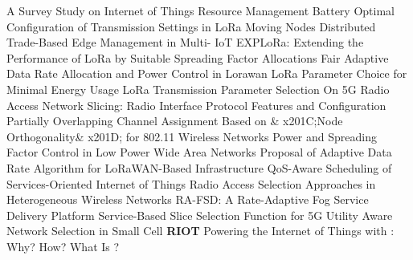  \cite{chowdhury_survey_2018} A Survey Study on {{Internet}} of {{Things}} Resource Management \newline 
 \cite{gupta_battery_2019} Battery {{Optimal Configuration}} of {{Transmission Settings}} in {{LoRa Moving Nodes}} \newline 
 \cite{samie_distributed_2018} Distributed {{Trade}}-{{Based Edge  Management}} in {{Multi}}-{{ IoT}} \newline 
 \cite{cuomo_explora_2017} {{EXPLoRa}}: {{Extending}} the Performance of {{LoRa}} by Suitable Spreading Factor Allocations \newline 
 \cite{abdelfadeel_fair_2018} Fair Adaptive Data Rate Allocation and Power Control in Lorawan \newline 
 \cite{dix-matthews_lora_2018} {{LoRa Parameter Choice}} for {{Minimal Energy Usage}} \newline 
 \cite{bor_lora_2017} {{LoRa Transmission Parameter Selection}} \newline 
 \cite{ferrus_5g_2018} On {{5G Radio Access Network Slicing}}: {{Radio Interface Protocol Features}} and {{Configuration}} \newline 
 \cite{cui_partially_2011} Partially Overlapping Channel Assignment Based on \& {{x201C}};Node Orthogonality\& {{x201D}}; for 802.11 Wireless Networks \newline 
 \cite{reynders_power_2017} Power and Spreading Factor Control in Low Power Wide Area Networks \newline 
 \cite{hauser_proposal_2017} Proposal of {{Adaptive Data Rate Algorithm}} for {{LoRaWAN}}-{{Based Infrastructure}} \newline 
 \cite{ling_li_qos-aware_2014} {{QoS}}-{{Aware Scheduling}} of {{Services}}-{{Oriented Internet}} of {{Things}} \newline 
 \cite{helou_radio_2013} Radio Access Selection Approaches in Heterogeneous Wireless Networks \newline 
 \cite{pahl_ra-fsd_2018} {{RA}}-{{FSD}}: {{A Rate}}-{{Adaptive Fog Service Delivery Platform}} \newline 
 \cite{sama_service-based_2016} Service-{{Based Slice Selection Function}} for {{5G}} \newline 
 \cite{munjal_utility_2019} Utility Aware Network Selection in Small Cell \newline 
\textbf{RIOT} \newline  \cite{baccelli_powering_2016} Powering the {{Internet}} of {{Things}} with {{}}: {{Why}}? {{How}}? {{What}} Is {{}}? \newline 
